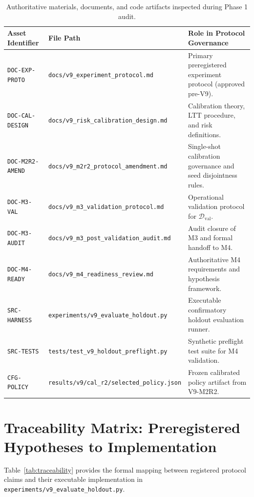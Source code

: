 \documentclass[10pt,a4paper]{article}
\begin{document}
\begin{table}[h]
\centering
\small
\begin{tabularx}{\textwidth}{llX}
\toprule
\textbf{Asset Identifier} & \textbf{File Path} & \textbf{Role in Protocol Governance} \\
\midrule
\texttt{DOC-EXP-PROTO} & \texttt{docs/v9\_experiment\_protocol.md} & Primary preregistered experiment protocol (approved pre-V9). \\
\texttt{DOC-CAL-DESIGN} & \texttt{docs/v9\_risk\_calibration\_design.md} & Calibration theory, LTT procedure, and risk definitions. \\
\texttt{DOC-M2R2-AMEND} & \texttt{docs/v9\_m2r2\_protocol\_amendment.md} & Single-shot calibration governance and seed disjointness rules. \\
\texttt{DOC-M3-VAL} & \texttt{docs/v9\_m3\_validation\_protocol.md} & Operational validation protocol for $\mathcal{D}_{\mathrm{val}}$. \\
\texttt{DOC-M3-AUDIT} & \texttt{docs/v9\_m3\_post\_validation\_audit.md} & Audit closure of M3 and formal handoff to M4. \\
\texttt{DOC-M4-READY} & \texttt{docs/v9\_m4\_readiness\_review.md} & Authoritative M4 requirements and hypothesis framework. \\
\texttt{SRC-HARNESS} & \texttt{experiments/v9\_evaluate\_holdout.py} & Executable confirmatory holdout evaluation runner. \\
\texttt{SRC-TESTS} & \texttt{tests/test\_v9\_holdout\_preflight.py} & Synthetic preflight test suite for M4 validation. \\
\texttt{CFG-POLICY} & \texttt{results/v9/cal\_r2/selected\_policy.json} & Frozen calibrated policy artifact from V9-M2R2. \\
\bottomrule
\end{tabularx}
\caption{Authoritative materials, documents, and code artifacts inspected during Phase 1 audit.}
\label{tab:materials}
\end{table}

\section{Traceability Matrix: Preregistered Hypotheses to Implementation}
Table~\ref{tab:traceability} provides the formal mapping between registered protocol claims and their executable implementation in \texttt{experiments/v9\_evaluate\_holdout.py}.
\end{document}
